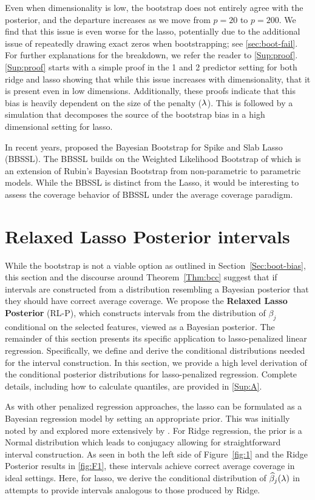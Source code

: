 Even when dimensionality is low, the bootstrap does not entirely agree with the posterior, and the departure increases as we move from $p=20$ to $p=200$. We find that this issue is even worse for the lasso, potentially due to the additional issue of repeatedly drawing exact zeros when bootstrapping; see \ref{sec:boot-fail}. For further explanations for the breakdown, we refer the reader to \ref{Sup:proof}. \ref{Sup:proof} starts with a simple proof in the 1 and 2 predictor setting for both ridge and lasso showing that while this issue increases with dimensionality, that it is present even in low dimensions. Additionally, these proofs indicate that this bias is heavily dependent on the size of the penalty ($\lambda$). This is followed by a simulation that decomposes the source of the bootstrap bias in a high dimensional setting for lasso.

In recent years, \cite{Nie2022} proposed the Bayesian Bootstrap for Spike and Slab Lasso (BBSSL). The BBSSL builds on the Weighted Likelihood Bootstrap of \cite{Newton1994} which is an extension of Rubin's Bayesian Bootstrap from non-parametric to parametric models. While the BBSSL is distinct from the Lasso, it would be interesting to assess the coverage behavior of BBSSL under the average coverage paradigm.

\section{Relaxed Lasso Posterior intervals}\label{Sec:methods}

While the bootstrap is not a viable option as outlined in Section~\ref{Sec:boot-bias}, this section and the discourse around Theorem~\ref{Thm:bcc} suggest that if intervals are constructed from a distribution resembling a Bayesian posterior that they should have correct average coverage. We propose the \textbf{Relaxed Lasso Posterior} (RL-P), which constructs intervals from the distribution of $\beta_j$ conditional on the selected features, viewed as a Bayesian posterior. The remainder of this section presents its specific application to lasso-penalized linear regression. Specifically, we define and derive the conditional distributions needed for the interval construction. In this section, we provide a high level derivation of the conditional posterior distributions for lasso-penalized regression. Complete details, including how to calculate quantiles, are provided in \ref{Sup:A}.

As with other penalized regression approaches, the lasso can be formulated as a Bayesian regression model by setting an appropriate prior. This was initially noted by \cite{Tibshirani1996} and explored more extensively by \cite{Park2008}.  For Ridge regression, the prior is a Normal distribution which leads to conjugacy allowing for straightforward interval construction. As seen in both the left side of Figure~\ref{fig:1} and the Ridge Posterior results in \ref{fig:F1}, these intervals achieve correct average coverage in ideal settings. Here, for lasso, we derive the conditional distribution of $\widehat{\beta}_j(\lambda)$ in attempts to provide intervals analogous to those produced by Ridge.

